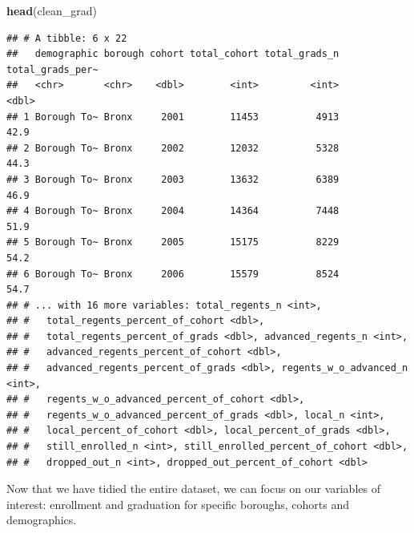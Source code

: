 \documentclass[
  english,
  man, fleqn, noextraspace]{apa6}
\newenvironment{Shaded}{\begin{snugshade}}{\end{snugshade}}
\newcommand{\KeywordTok}[1]{\textcolor[rgb]{0.13,0.29,0.53}{\textbf{#1}}}
\newcommand{\NormalTok}[1]{#1}
\begin{document}
\begin{Shaded}
\begin{Highlighting}[]
\KeywordTok{head}\NormalTok{(clean_grad)}
\end{Highlighting}
\end{Shaded}

\begin{verbatim}
## # A tibble: 6 x 22
##   demographic borough cohort total_cohort total_grads_n total_grads_per~
##   <chr>       <chr>    <dbl>        <int>         <int>            <dbl>
## 1 Borough To~ Bronx     2001        11453          4913             42.9
## 2 Borough To~ Bronx     2002        12032          5328             44.3
## 3 Borough To~ Bronx     2003        13632          6389             46.9
## 4 Borough To~ Bronx     2004        14364          7448             51.9
## 5 Borough To~ Bronx     2005        15175          8229             54.2
## 6 Borough To~ Bronx     2006        15579          8524             54.7
## # ... with 16 more variables: total_regents_n <int>,
## #   total_regents_percent_of_cohort <dbl>,
## #   total_regents_percent_of_grads <dbl>, advanced_regents_n <int>,
## #   advanced_regents_percent_of_cohort <dbl>,
## #   advanced_regents_percent_of_grads <dbl>, regents_w_o_advanced_n <int>,
## #   regents_w_o_advanced_percent_of_cohort <dbl>,
## #   regents_w_o_advanced_percent_of_grads <dbl>, local_n <int>,
## #   local_percent_of_cohort <dbl>, local_percent_of_grads <dbl>,
## #   still_enrolled_n <int>, still_enrolled_percent_of_cohort <dbl>,
## #   dropped_out_n <int>, dropped_out_percent_of_cohort <dbl>
\end{verbatim}

Now that we have tidied the entire dataset, we can focus on our variables of interest: enrollment and graduation for specific boroughs, cohorts and demographics.
\end{document}
